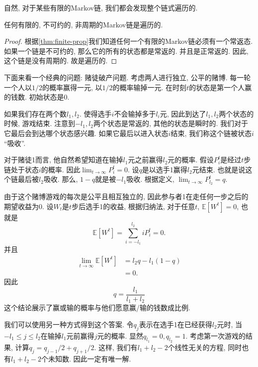 自然, 对于某些有限的Markov链, 我们都会发现整个链式遍历的. 

\begin{theorem}
    任何有限的, 不可约的, 非周期的Markov链是遍历的. 
\end{theorem}

\begin{proof}
    根据\cref{thm:finite-prop}我们知道任何一个有限的Markov链必须有一个常返态. 如果一个链是不可约的, 那么它的所有的状态都是常返的. 并且是正常返的. 因此, 这个链是没有周期的. 故是遍历的. 
\end{proof}


\begin{example}
    下面来看一个经典的问题: 赌徒破产问题. 考虑两人进行独立, 公平的赌博. 每一轮一个人以$1/2$的概率赢得一元, 以$1/2$的概率输掉一元. 在时刻$t$的状态是第一个人赢的钱数. 初始状态是0. 
    
    如果我们存在两个数$l_1, l_2$. 使得选手$i$不会输掉多于$l_i$元, 因此到达了$l_1, l_2$两个状态的时候, 游戏结束. 注意到$-l_1, l_2$两个状态是常返的, 其他的状态是瞬时的. 我们对于它最后会到达哪个状态感兴趣. 如果它最后以进入状态$i$结束, 我们称这个链被状态$i$ ``吸收''. 
    
    对于赌徒1而言, 他自然希望知道在输掉$l_1$元之前赢得$l_2$元的概率. 假设$P_i^t$是经过$t$步链处于状态$i$的概率. 因此$\lim _{t \rightarrow \infty} P_i^t=0$. 设$q$是以选手1赢得$l_2$元结束. 也就是说这个链最后被$l_2$吸收. 那么, $1-q$就是被$-l_1$吸收. 根据定义, $\lim _{t \rightarrow \infty} P_{l_2}^t=q$.

    由于这个赌博游戏的每次是公平且相互独立的, 因此参与者1在走任何一步之后的期望收益为0. 设$W_t$是$t$步后选手1的收益, 根据归纳法, 对于任意$t$, $\mathbb{E}\left[W^t\right]=0$, 也就是
    $$\mathbb{E}\left[W^t\right]=\sum_{i=-l_1}^{l_2} i P_i^t=0.$$
    并且
    $$
\begin{aligned}
\lim _{t \rightarrow \infty} \mathbb{E}\left[W^t\right] & =l_2 q-l_1(1-q) \\
& =0 .
\end{aligned}
$$
因此
$$
q=\frac{l_1}{l_1+l_2}
$$
这个结论展示了赢或输的概率与他们愿意赢/输的钱数成比例. 

我们可以使用另一种方式得到这个答案. 令$q_j$表示在选手1在已经获得$l_2$元时, 当$-l_1\leq j\leq l_2$在输掉$l_1$元前赢得$j$元的概率. 显然$q_{l_1}=0,q_{l_2}=1. $ 考虑第一次游戏的结果, 计算$q_j=q_{j-1}/2 + q_{j+1}/2$. 这样, 我们有$l_1+l_2-2$个线性无关的方程, 同时也有$l_1+l_2-2$个未知数. 因此一定有唯一解. 

\end{example}